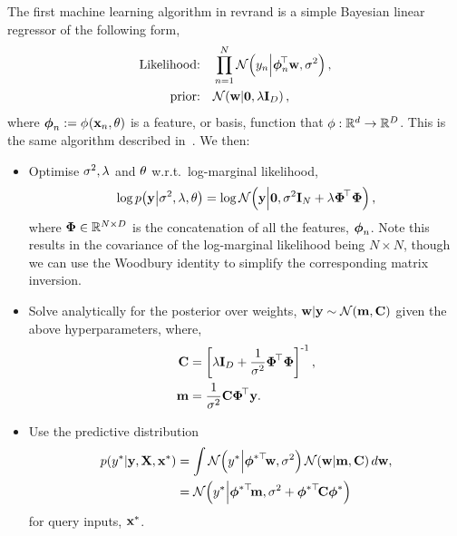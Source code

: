 \documentclass[11pt, oneside]{article}
\begin{document}
The first machine learning algorithm in revrand is a simple Bayesian linear
regressor of the following form,
\begin{align}
    \text{Likelihood:} \quad &\prod^N_{n=1} 
    \gausC{\targs_n}{\feats_n\T\weights, \var}, \\
    \text{prior:} \quad &\gausC{\weights}{\mathbf{0}, \reg\ident{D}},
\end{align}
where $\feats_n := \func{\featfunc}{\inss_n, \param}{}$ is a feature, or basis,
function that $\featfunc: \real{d} \to \real{D}$. This is the same algorithm
described in~\cite[Chapter 2]{Rasmussen2006}. We then:
\begin{itemize}
    \item Optimise $\var, \reg$ and $\param$ w.r.t.\ log-marginal likelihood,
        \begin{equation}
            \log \probC{\targ}{\var, \reg, \param} =
            \log \gausC{\targ}{\mathbf{0}, \var\ident{N} + \reg \feat\T\feat},
        \end{equation}
        where $\feat \in \real{N \times D}$ is the concatenation of all the
        features, $\feats_n$. Note this results in the covariance of the
        log-marginal likelihood being $N \times N$, though we can use the
        Woodbury identity to simplify the corresponding matrix inversion.
    \item Solve analytically for the posterior over weights, $\weights | \targ
        \sim \gaus{\pomean, \pocov}$ given the above hyperparameters, where,
        \begin{align*}
            \pocov &= \sbrac{\reg \ident{D} + \frac{1}{\var}
                \feat\T \feat}\inv, \\
            \pomean &= \frac{1}{\var} \pocov \feat\T \targ.
        \end{align*}
    \item Use the predictive distribution
        \begin{align}
            \probC{\targs\test}{\targ, \ins, \inss\test} &= \int
            \gausC{\targs\test}{\feats\testT\weights, \var}
            \gausC{\weights}{\pomean, \pocov} d\weights, \nonumber \\
            &= \gausC{\targs\test}{\feats\testT \pomean,
                \var + \feats\testT \pocov \feats\test}
        \end{align}
        for query inputs, $\inss\test$.
\end{itemize}
\end{document}
